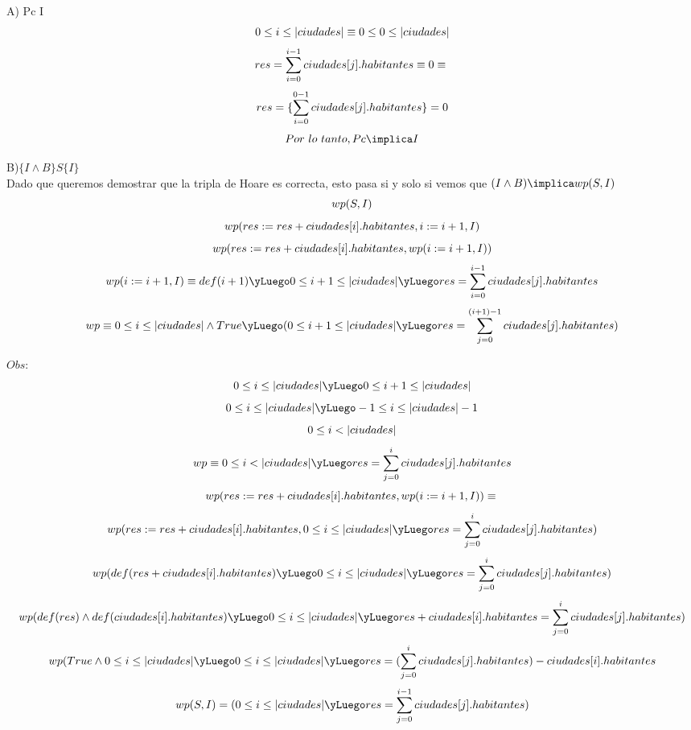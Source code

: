 \documentclass[10pt,a4paper]{article}
\begin{document}
\vspace{0.5cm}

A) Pc \implica I \vspace{0.2cm}\\

\[
0 \leq i \leq |ciudades| \equiv 0 \leq 0 \leq |ciudades| 
\vspace{0.2cm}
\]
\[
res =\sum\limits_{i=0}^{i-1}ciudades[j].habitantes \equiv 0 \equiv
 \vspace{0.2cm}\\
\]
\[
res = \{\sum\limits_{i=0}^{0-1}ciudades[j].habitantes\} = 0 
\vspace{0.5cm}\\
\]
\[
Por \ lo \ tanto, Pc \implica I 
\vspace{0.5cm}\\
\]

B)$\{I \land B \} S \{I\}$ \vspace{0.2cm}\\

Dado que queremos demostrar que la tripla de Hoare es correcta, esto pasa si y solo si vemos que $(I \land B) \implica wp(S,I)$\\
\[wp(S,I)\\\]
\[wp(res := res + ciudades[i].habitantes, i := i+1, I)\\\]
\[wp(res := res + ciudades[i].habitantes, wp(i := i+1, I))\\ \\\]
\[wp (i := i+1, I) \equiv def(i+1) \yLuego 0 \leq i+1 \leq |ciudades| \yLuego res = \sum\limits_{i=0}^{i-1}ciudades[j].habitantes\\\]
\[wp \equiv 0 \leq i \leq |ciudades| \land True \yLuego (0 \leq i+1 \leq |ciudades| \yLuego res = \sum\limits_{j=0}^{(i+1)-1}ciudades[j].habitantes)\\ \]

$Obs:$\\ 
\[0 \leq i \leq |ciudades| \yLuego 0 \leq i+1 \leq |ciudades|\\  \]
\[0 \leq i \leq |ciudades| \yLuego -1 \leq i \leq |ciudades|-1\\\]
\[0 \leq i < |ciudades|\\ \]
\[
wp \equiv 0 \leq i < |ciudades| \yLuego res = \sum\limits_{j=0}^{i}ciudades[j].habitantes\\\]
\[wp(res := res + ciudades[i].habitantes, wp(i := i+1, I)) \equiv \\\]
\[wp(res := res + ciudades[i].habitantes, 0 \leq i \leq |ciudades| \yLuego res = {\sum\limits_{j=0}^{i}ciudades[j].habitantes})\]
\[wp(def(res+ciudades[i].habitantes) \yLuego 0 \leq i \leq |ciudades| \yLuego res = {\sum\limits_{j=0}^{i}ciudades[j].habitantes})\]
\[wp(def(res) \land def(ciudades[i].habitantes) \yLuego 0 \leq i \leq |ciudades| \yLuego res+ciudades[i].habitantes = {\sum\limits_{j=0}^{i}ciudades[j].habitantes})\]
\[wp(True \land 0 \leq i \leq |ciudades| \yLuego 0 \leq i \leq |ciudades| \yLuego res = ({\sum\limits_{j=0}^{i}ciudades[j].habitantes})-ciudades[i].habitantes\]
\[wp(S,I)=(0 \leq i \leq |ciudades| \yLuego res = {\sum\limits_{j=0}^{i-1}ciudades[j].habitantes})\\\]
\vspace{0.5cm}\\	
\end{document}
